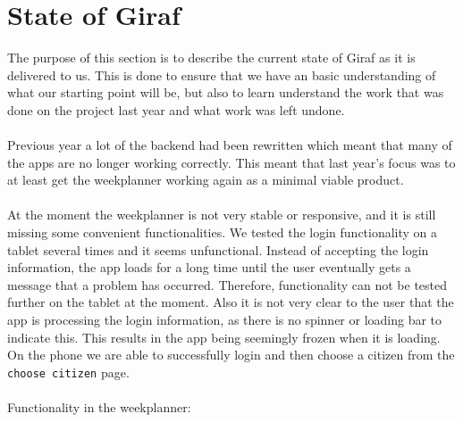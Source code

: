 \section{State of Giraf}
The purpose of this section is to describe the current state of Giraf as it is delivered to us.
This is done to ensure that we have an basic understanding of what our starting point will be, but also to learn understand the work that was done on the project last year and what work was left undone.
\\\\
Previous year a lot of the backend had been rewritten which meant that many of the apps are no longer working correctly.
This meant that last year's focus was to at least get the weekplanner working again as a minimal viable product.
\\\\
At the moment the weekplanner is not very stable or responsive, and it is still missing some convenient functionalities.
We tested the login functionality on a tablet several times and it seems unfunctional.
Instead of accepting the login information, the app loads for a long time until the user eventually gets a message that a problem has occurred.
Therefore, functionality can not be tested further on the tablet at the moment.
Also it is not very clear to the user that the app is processing the login information, as there is no spinner or loading bar to indicate this.
This results in the app being seemingly frozen when it is loading.
On the phone we are able to successfully login and then choose a citizen from the \texttt{choose citizen} page.
\\\\
Functionality in the weekplanner:
